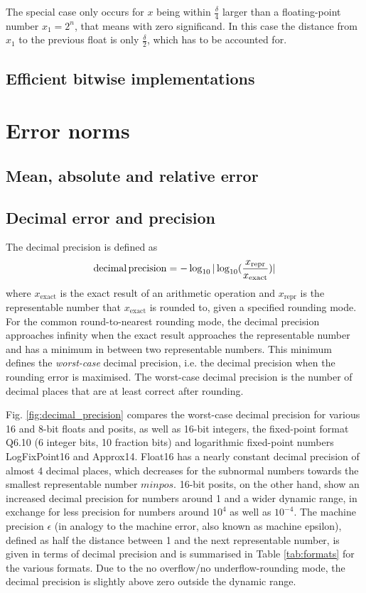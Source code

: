 The special case only occurs for $x$ being within $\tfrac{\delta}{4}$ larger than a floating-point number $x_1 = 2^n$, that means with zero significand.
In this case the distance from $x_1$ to the previous float is only $\tfrac{\delta}{2}$, which has to be accounted for.


\subsection{Efficient bitwise implementations}
\label{sec:bitwiseop}

\section{Error norms}
\label{sec:error_norms}

\subsection{Mean, absolute and relative error}
	
	\subsection{Decimal error and precision}
	\label{sec:decimal_precision}

The decimal precision is defined as \citep{Gustafson2017,Gustafson2017a}
\begin{equation}
\operatorname{decimal} \operatorname{precision} = -\log_{10} \vert \log_{10}( \frac{x_\text{repr}}{x_\text{exact}} ) \vert
\end{equation}
where $x_\text{exact}$ is the exact result of an arithmetic operation and $x_\text{repr}$ is the representable number
that $x_\text{exact}$ is rounded to, given a specified rounding mode. For the common round-to-nearest rounding mode,
the decimal precision approaches infinity when the exact result approaches the representable number and has a minimum
in between two representable numbers. This minimum defines the \emph{worst-case} decimal precision, i.e. the decimal
precision when the rounding error is maximised. The worst-case decimal precision is the number of decimal places that
are at least correct after rounding.

Fig. \ref{fig:decimal_precision} compares the worst-case decimal precision for various 16 and 8-bit floats and posits,
as well as 16-bit integers, the fixed-point format Q6.10 (6 integer bits, 10 fraction bits) and logarithmic fixed-point numbers
LogFixPoint16 and Approx14. Float16 has a nearly constant decimal precision of almost 4 decimal places, which decreases
for the subnormal numbers towards the smallest representable number $minpos$. 16-bit posits, on the other hand, show an
increased decimal precision for numbers around 1 and a wider dynamic range, in exchange for less precision for numbers
around $10^4$ as well as $10^{-4}$.  The machine precision $\epsilon$ (in analogy to the machine error, also known as
machine epsilon), defined as half the distance between 1 and the next representable number, is given in terms of decimal
precision and is summarised in Table \ref{tab:formats} for the various formats. Due to the no overflow/no underflow-rounding
mode, the decimal precision is slightly above zero outside the dynamic range.

